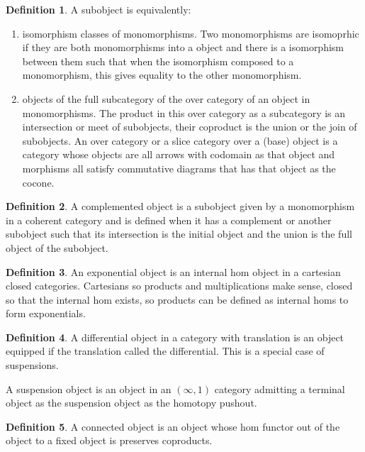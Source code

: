 \documentclass[10pt]{article}
\theoremstyle{plain}%
\theoremstyle{definition}
\newtheorem{definition}{Definition}[section]
\theoremstyle{remark}
\begin{document}
\begin{definition}
    A subobject is equivalently:
    \begin{enumerate}
        \item isomorphism classes of monomorphisms. Two monomorphisms are isomoprhic if they are both monomorphisms into a object and there is a isomorphism between them such that when the isomorphism composed to a monomorphism, this gives equality to the other monomorphism.
        \item objects of the full subcategory of the over category of an object in monomorphisms. The product in this over category as a subcategory is an intersection or meet of subobjects, their coproduct is the union or the join of subobjects. An over category or a slice category over a (base) object is a category whose objects are all arrows with codomain as that object and morphisms all satisfy commutative diagrams that has that object as the cocone.
    \end{enumerate}
\end{definition}

\begin{definition}
    A complemented object is a subobject given by a monomorphism in a coherent category and is defined when it has a complement or another subobject such that its intersection is the initial object and the union is the full object of the subobject.
\end{definition}

\begin{definition}
    An exponential object is an internal hom object in a cartesian closed categories. Cartesians so products and multiplications make sense, closed so that the internal hom exists, so products can be defined as internal homs to form exponentials.
\end{definition}

\begin{definition}
    A differential object in a category with translation is an object equipped if the translation called the differential. This is a special case of suspensions.

    A suspension object is an object in an $(\infty,1)$ category admitting a terminal object as the suspension object as the homotopy pushout.
\end{definition}

\begin{definition}
    A connected object is an object whose hom functor out of the object to a fixed object is preserves coproducts.
\end{definition}
\end{document}
